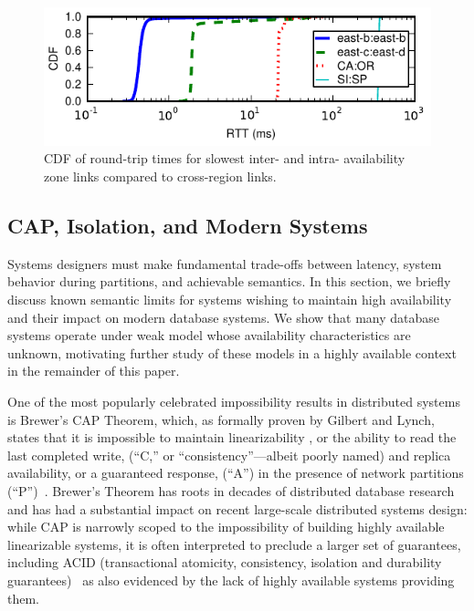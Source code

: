 \begin{figure}
\includegraphics[width=\columnwidth]{graphs/ping-plot.pdf}
\caption{CDF of round-trip times for slowest inter- and intra-
  availability zone links compared to cross-region links.}
\label{fig:rtt}
\end{figure}


\subsection{CAP, Isolation, and Modern Systems}
\label{sec:modernacid}

Systems designers must make fundamental trade-offs between latency,
system behavior during partitions, and achievable semantics. In this
section, we briefly discuss known semantic limits for systems wishing
to maintain high availability and their impact on modern database
systems. We show that many database systems operate under weak model
whose availability characteristics are unknown, motivating further
study of these models in a highly available context in the remainder
of this paper.

One of the most popularly celebrated impossibility results in
distributed systems is Brewer's CAP Theorem, which, as formally proven
by Gilbert and Lynch, states that it is impossible to maintain
linearizability , or the ability to read the last completed write,
(``C,'' or ``consistency''---albeit poorly named) and replica
availability, or a guaranteed response, (``A'') in the presence of
network partitions (``P'')~\cite{gilbert-cap}. Brewer's Theorem has
roots in decades of distributed database
research~\cite{davidson-survey} and has had a substantial impact on
recent large-scale distributed systems design: while CAP is narrowly
scoped to the impossibility of building highly available linearizable
systems, it is often interpreted to preclude a larger set of
guarantees, including ACID (transactional atomicity, consistency,
isolation and durability guarantees)~\cite{hn, foundation-article} as
also evidenced by the lack of highly available systems providing them.

